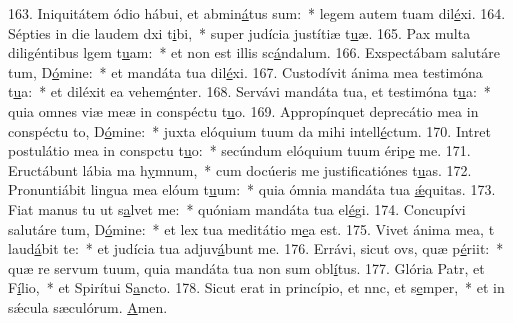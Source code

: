 163. Iniquitátem ódio hábui, et abmin\uline{á}tus sum:~* legem autem tuam dil\uline{é}xi.
164. Sépties in die laudem dxi t\uline{i}bi,~* super judícia justítiæ t\uline{u}æ.
165. Pax multa diligéntibus lgem t\uline{u}am:~* et non est illis sc\uline{á}ndalum.
166. Exspectábam salutáre tum, D\uline{ó}mine:~* et mandáta tua dil\uline{é}xi.
167. Custodívit ánima mea testimóna t\uline{u}a:~* et diléxit ea vehem\uline{é}nter.
168. Servávi mandáta tua, et testimóna t\uline{u}a:~* quia omnes viæ meæ in conspéctu t\uline{u}o.
169. Appropínquet deprecátio mea in conspéctu to, D\uline{ó}mine:~* juxta elóquium tuum da mihi intell\uline{é}ctum.
170. Intret postulátio mea in conspctu t\uline{u}o:~* secúndum elóquium tuum érip\uline{e} me.
171. Eructábunt lábia ma h\uline{y}mnum,~* cum docúeris me justificatiónes t\uline{u}as.
172. Pronuntiábit lingua mea elóum t\uline{u}um:~* quia ómnia mandáta tua \uline{ǽ}quitas.
173. Fiat manus tu ut s\uline{a}lvet me:~* quóniam mandáta tua el\uline{é}gi.
174. Concupívi salutáre tum, D\uline{ó}mine:~* et lex tua meditátio m\uline{e}a est.
175. Vivet ánima mea, t laud\uline{á}bit te:~* et judícia tua adjuv\uline{á}bunt me.
176. Errávi, sicut ovs, quæ p\uline{é}riit:~* quæ re servum tuum, quia mandáta tua non sum obl\uline{í}tus.
177. Glória Patr, et F\uline{í}lio,~* et Spirítui S\uline{a}ncto.
178. Sicut erat in princípio, et nnc, et s\uline{e}mper,~* et in sǽcula sæculórum. \uline{A}men.
